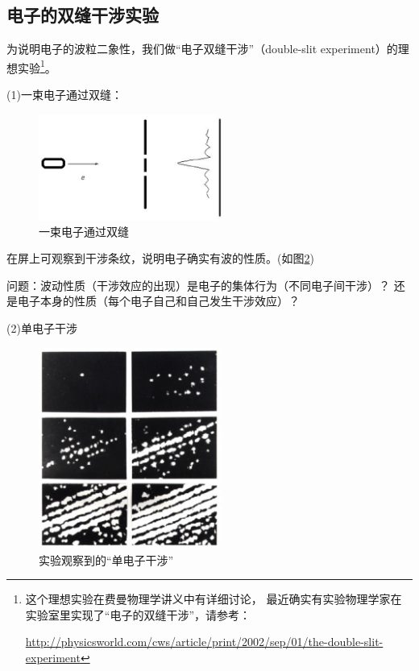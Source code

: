 \subsection{电子的双缝干涉实验}

为说明电子的波粒二象性，我们做``电子双缝干涉''（double-slit
experiment）的理想实验\footnote{这个理想实验在费曼物理学讲义中有详细讨论，
最近确实有实验物理学家在实验室里实现了``电子的双缝干涉''，请参考：

\url{http://physicsworld.com/cws/article/print/2002/sep/01/the-double-slit-experiment}

}。


(1)一束电子通过双缝：

\begin{figure}[ht]
\begin{center}
\includegraphics[clip,width=6cm]{Duality/5-4.ps}
\caption{一束电子通过双缝}\label{Duality/5-4-ps}
\end{center}
\end{figure}

在屏上可观察到干涉条纹，说明电子确实有波的性质。(如图\ref{5-4-ps})

问题：波动性质（干涉效应的出现）是电子的集体行为（不同电子间干涉）？
还是电子本身的性质（每个电子自己和自己发生干涉效应）？

(2)单电子干涉

\begin{figure}[ht]
\begin{center}
\includegraphics[clip,width=6cm]{Duality/double-slit.ps}
\caption{实验观察到的``单电子干涉''}\label{5-4-ps}
\end{center}
\end{figure}


